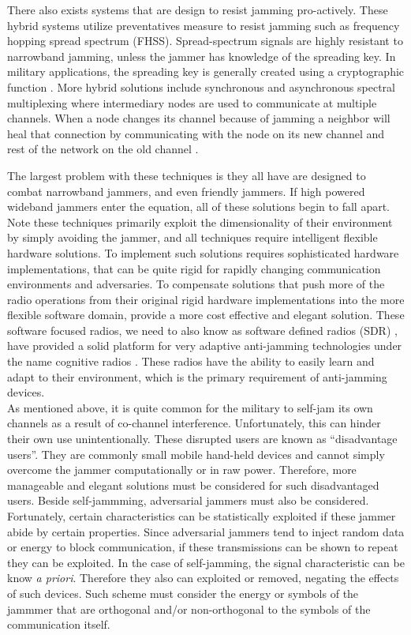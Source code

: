 There also exists systems that are design to resist jamming pro-actively.  These hybrid systems \cite{7} utilize preventatives measure to resist jamming such as frequency hopping spread spectrum (FHSS).  Spread-spectrum signals are highly resistant to narrowband jamming, unless the jammer has knowledge of the spreading key. In military applications, the spreading key is generally created using a cryptographic function \cite{sterling}.  More hybrid solutions include synchronous and asynchronous spectral multiplexing where intermediary nodes are used to communicate at multiple channels.  When a node changes its channel because of jamming a neighbor will heal that connection by communicating  with the node on its new channel and rest of the network on the old channel \cite{8}.


The largest problem with these techniques is they all have are designed to combat narrowband jammers, and even friendly jammers.  If high powered wideband jammers enter the equation, all of these solutions begin to fall apart.  Note these techniques primarily exploit the dimensionality of their environment by simply avoiding the jammer, and all techniques require intelligent flexible hardware solutions.   To implement such solutions requires sophisticated hardware implementations, that can be quite rigid for rapidly changing communication environments and adversaries.  To compensate solutions that push more of the radio operations from their original rigid hardware implementations into the more flexible software domain, provide a more cost effective and elegant solution.  These software focused radios, we need to also know as software defined radios (SDR) \cite{TBD}, have provided a solid platform for very adaptive anti-jamming technologies under the name cognitive radios \cite{TBD}.  These radios have the ability to easily learn and adapt to their environment, which is the primary requirement of anti-jamming devices.\\

As mentioned above, it is quite common for the military to self-jam its own channels as a result of co-channel interference.  Unfortunately, this can hinder their own use unintentionally.  These disrupted users are known as ``disadvantage users''.  They are commonly small mobile hand-held devices and cannot simply overcome the jammer computationally or in raw power.  Therefore, more manageable and elegant solutions must be considered for such disadvantaged users.  Beside self-jammming, adversarial jammers must also be considered.  Fortunately, certain characteristics can be statistically exploited if these jammer abide by certain properties. Since adversarial jammers tend to inject random data or energy to block communication, if these transmissions can be shown to repeat they can be exploited.  In the case of self-jamming, the signal characteristic can be know \textit{a priori}.  Therefore they also can exploited or removed, negating the effects of such devices.  Such scheme must consider the energy or symbols of the jammmer that are orthogonal and/or non-orthogonal to the symbols of the communication itself.\\


